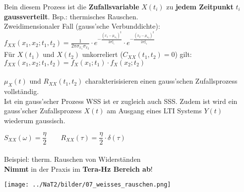 Bein diesem Prozess ist die \textbf{Zufallsvariable} $X(t_{i})$ zu \textbf{jedem Zeitpunkt} $t_{i}$
\textbf{gaussverteilt}. Bsp.: thermisches Rauschen. \\
Zweidimensionaler Fall (gauss'sche Verbunddichte): 
        $f_{XX}(x_{1},x_{2};t_{1},t_{2}) = \frac{1}{2\pi \sigma_{x_{1}}\sigma_{x_{2}}} \cdot
                                      e^{-\frac{(x_{1}-\mu_{x_{1}})^{2}}{2 \sigma^{2}_{x_{1}}}} \cdot
                                      e^{-\frac{(x_{2}-\mu_{x_{2}})^{2}}{2 \sigma^{2}_{x_{2}}}}$ \\
Für $X(t_{1})$ und $X(t_{2})$ unkorreliert ($C_{XX}(t_{1},t_{2})=0$) gilt:
        $f_{XX}(x_{1},x_{2}; t_{1},t_{2}) = f_{X}(x_{1};t_{1}) \cdot f_{X}(x_{2};t_{2}) $ \\ \\
$\mu_{X}(t)$ und $R_{XX}(t_{1}, t_{2})$ charakterisisieren einen gauss'schen Zufallsprozess
        vollst\"andig. \\
Ist ein gauss'scher Prozess WSS ist er zugleich auch SSS. Zudem ist wird ein gauss'scher
Zufallsprozess $X(t)$ am Ausgang eines LTI Systems $Y(t)$ wiederum gaussisch.

\begin{center}
	\begin{minipage}{8cm}
		$S_{XX}(\omega) = \dfrac{\eta}{2} \qquad R_{XX}(\tau) = \dfrac{\eta}{2} \cdot \delta(\tau)$ \\ \\
		Beispiel: therm. Rauschen von Widerständen \\
		\textbf{Nimmt} in der Praxis im \textbf{Tera-Hz Bereich ab}!
  	\end{minipage}
	\begin{minipage}{10cm}
		\texttt{[image: ../NaT2/bilder/07\_weisses\_rauschen.png]}
  	\end{minipage}
\end{center}

